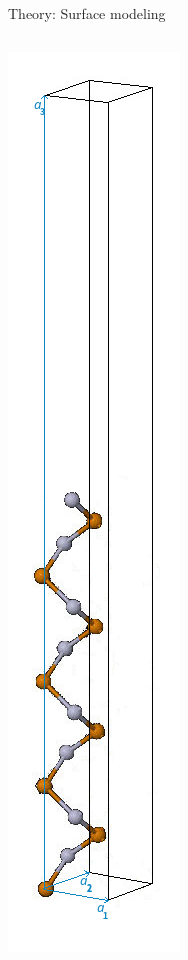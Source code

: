 \begin{frame}{Theory: Surface modeling}
\begin{columns}
\begin{column}
			\includegraphics[width=\linewidth]{andere_bilder/hgte_16layer_supercell_2.jpg} 

\end{column}
\end{columns}
\end{frame}
